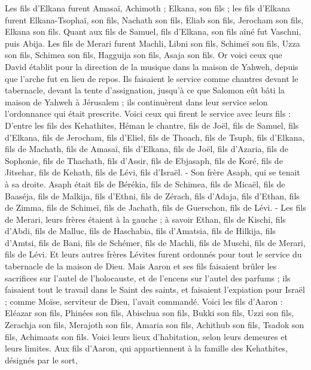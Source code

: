 \begin{multicols}{2}
Les fils d’Elkana furent  Amasaï, Achimoth ;
Elkana, son fils ; les fils d’Elkana furent Elkana-Tsophaï, son fils, Nachath son fils,
Eliab son fils, Jerocham son fils, Elkana son fils.
Quant aux fils de Samuel, fils d'Elkana, son fils aîné fut Vaschni, puis Abija.
Les fils de Merari furent Machli, Libni son fils, Schimeï son fils, Uzza son fils,
Schimea son fils, Hagguija son fils, Asaja son fils.
Or voici ceux que David établit pour la direction de la musique dans la maison de Yahweh, depuis que l’arche fut en lieu de repos.
Ils faisaient le service comme chantres devant le tabernacle, devant la tente d'assignation, jusqu'à ce que Salomon eût bâti la maison de Yahweh à Jérusalem ; ils continuèrent dans leur service selon l'ordonnance qui était prescrite. Voici ceux qui firent le service avec leurs fils : D'entre les fils des Kehathites, Héman le chantre, fils de Joël, fils de Samuel,
fils d'Elkana, fils de Jerocham, fils d’Eliel, fils de Thoach,
fils de Tsuph, fils d'Elkana, fils de Machath, fils de Amasaï,
fils d'Elkana, fils de Joël, fils d’Azaria, fils de Sophonie,
fils de Thachath, fils d'Assir, fils de Ebjasaph, fils de Koré,
fils de Jitsehar, fils de Kehath, fils de Lévi, fils d'Israël.
- Son frère Asaph, qui se tenait à sa droite. Asaph était fils de Bérékia, fils de Schimea,
fils de Micaël, fils de Baaséja, fils de Malkija,
fils d’Ethni, fils de Zérach, fils d’Adaja,
fils d'Ethan, fils de Zimma, fils de Schimeï,
fils de Jachath, fils de Guerschon, fils de Lévi.
- Les fils de Merari, leurs frères étaient à la gauche ; à savoir Ethan, fils de Kischi, fils d’Abdi, fils de Malluc,
fils de Haschabia, fils d'Amatsia, fils de Hilkija,
fils d'Amtsi, fils de Bani, fils de Schémer,
fils de Machli, fils de Muschi, fils de Merari, fils de Lévi.
Et leurs autres frères Lévites furent ordonnés pour tout le service du tabernacle de la maison de Dieu.
Mais Aaron et ses fils faisaient brûler les sacrifices sur l'autel de l'holocauste, et de l’encens sur l'autel des parfums ; ils faisaient tout le travail dans le Saint des saints, et faisaient l’expiation pour Israël ; comme Moïse, serviteur de Dieu, l'avait commandé.
Voici les fils d'Aaron : Eléazar son fils, Phinées son fils, Abischua son fils,
Bukki son fils, Uzzi son fils, Zerachja son fils,
Merajoth son fils, Amaria son fils, Achithub son fils,
Tsadok son fils, Achimaats son fils.
Voici leurs lieux d’habitation, selon leurs demeures et leurs limites. Aux fils d'Aaron, qui appartiennent à la famille des Kehathites, désignés par le sort,

\end{multicols}
